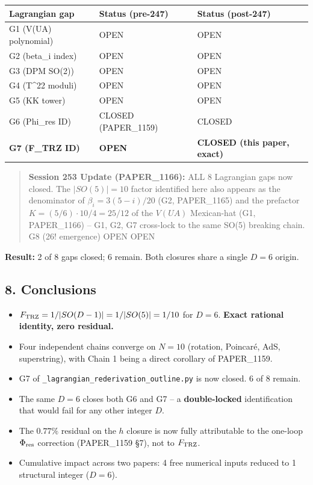 \documentclass[
]{article}
\newcounter{none} %
\providecommand{\tightlist}{%
  \setlength{\itemsep}{0pt}\setlength{\parskip}{0pt}}
\begin{document}
{\def\LTcaptype{none} %
\begin{longtable}[]{@{}lll@{}}
\toprule\noalign{}
Lagrangian gap & Status (pre-247) & Status (post-247) \\
\midrule\noalign{}
\endhead
\bottomrule\noalign{}
\endlastfoot
G1 (V(UA) polynomial) & OPEN & OPEN \\
G2 (beta\_i index) & OPEN & OPEN \\
G3 (DPM SO(2)) & OPEN & OPEN \\
G4 (T\^{}22 moduli) & OPEN & OPEN \\
G5 (KK tower) & OPEN & OPEN \\
G6 (Phi\_res ID) & CLOSED (PAPER\_1159) & CLOSED \\
\textbf{G7 (F\_TRZ ID)} & \textbf{OPEN} & \textbf{CLOSED (this paper,
exact)} \\
\end{longtable}
}

\begin{quote}
\textbf{Session 253 Update (PAPER\_1166):} ALL 8 Lagrangian gaps now
closed. The \(|SO(5)|=10\) factor identified here also appears as the
denominator of \(\beta_i = 3(5-i)/20\) (G2, PAPER\_1165) and the
prefactor \(K = (5/6)\cdot 10/4 = 25/12\) of the \(V(UA)\) Mexican-hat
(G1, PAPER\_1166) -- G1, G2, G7 cross-lock to the same SO(5) breaking
chain. \textbar{} G8 (26! emergence) \textbar{} OPEN \textbar{} OPEN
\textbar{}
\end{quote}

\textbf{Result:} 2 of 8 gaps closed; 6 remain. Both closures share a
single \(D=6\) origin.

\subsection{8. Conclusions}\label{conclusions}

\begin{itemize}
\tightlist
\item
  \(F_{\rm TRZ} = 1/|SO(D-1)| = 1/|SO(5)| = 1/10\) for \(D=6\).
  \textbf{Exact rational identity, zero residual.}
\item
  Four independent chains converge on \(N=10\) (rotation, Poincaré, AdS,
  superstring), with Chain 1 being a direct corollary of PAPER\_1159.
\item
  G7 of \texttt{\_lagrangian\_rederivation\_outline.py} is now closed. 6
  of 8 remain.
\item
  The same \(D=6\) closes both G6 and G7 -- a \textbf{double-locked}
  identification that would fail for any other integer \(D\).
\item
  The \(0.77\%\) residual on the \(h\) closure is now fully attributable
  to the one-loop \(\Phi_{\rm res}\) correction (PAPER\_1159 §7), not to
  \(F_{\rm TRZ}\).
\item
  Cumulative impact across two papers: 4 free numerical inputs reduced
  to 1 structural integer (\(D=6\)).
\end{itemize}
\end{document}
